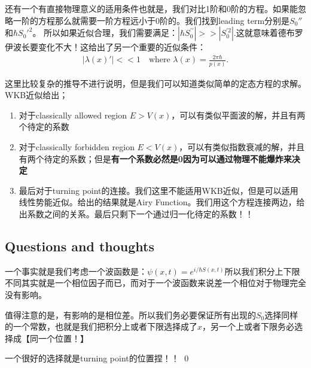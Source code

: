 \line
还有一个有直接物理意义的适用条件也就是，我们对比1阶和0阶的方程。如果能忽略一阶的方程那么就需要一阶方程远小于0阶的。我们找到leading
term分别是$ S_0'' $和$ \hbar S_0'^2 $。
所以如果近似合理，我们需要满足：$ \left|\hbar S_{0}^{\prime\prime}\right|
>>\left|S_{0}^{\prime2}\right|. $这就意味着德布罗伊波长要变化不大！这给出了另一个重要的近似条件：
\begin{align}
  |\lambda(x)'| << 1 \quad \text{where } \lambda(x) = \frac{2\pi\hbar}{p(x)}.
\end{align}

\bigskip
{}

这里比较复杂的推导不进行说明，但是我们可以知道类似简单的定态方程的求解。WKB近似给出；
\begin{enumerate}
  \item 对于classically allowed region $ E>V(x) $，可以有类似平面波的解，并且有两个待定的系数
  \item 对于classically forbidden region $ E<V(x)
    $，可以有类似指数衰减的解，并且有两个待定的系数；但是\textbf{有一个系数必然是0因为可以通过物理不能爆炸来决定}
  \item 最后对于turning point的连接。我们这里不能适用WKB近似，但是可以适用线性势能近似。给出的结果就是Airy
    Function。我们用这个方程连接两边，给出系数之间的关系。最后只剩下一个通过归一化待定的系数！！
\end{enumerate}

\subsection{Questions and thoughts}


一个事实就是我们考虑一个波函数是：$ \psi(x,t)  = e^{i/\hbar
S(x,t)}$所以我们积分上下限不同其实就是一个相位因子而已，而对于一个波函数来说差一个相位对于物理完全没有影响。

值得注意的是，有影响的是相位差。所以我们务必要保证所有出现的$ S_0 $选择同样的一个常数，也就是我们把积分上或者下限选择成了$ x
$，另一个上或者下限务必选择成【同一个位置！】

一个很好的选择就是turning point的位置捏！！
\qed
